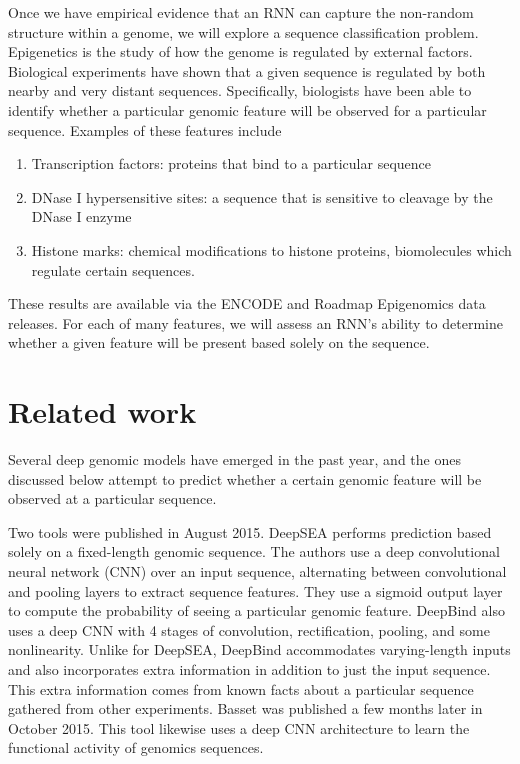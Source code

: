 \documentclass{article} %
\begin{document}
Once we have empirical evidence that an RNN can capture the non-random structure within a genome, we will explore a sequence classification problem. Epigenetics is the study of how the genome is regulated by external factors. Biological experiments have shown that a given sequence is regulated by both nearby and very distant sequences. Specifically, biologists have been able to identify whether a particular genomic feature will be observed for a particular sequence. Examples of these features include
\begin{enumerate}
	\item Transcription factors: proteins that bind to a particular sequence
	\item DNase I hypersensitive sites: a sequence that is sensitive to cleavage by the DNase I enzyme
	\item Histone marks: chemical modifications to histone proteins, biomolecules  which regulate certain sequences.
\end{enumerate}

These results are available via the ENCODE and Roadmap Epigenomics data releases. For each of many features, we will assess an RNN's ability to determine whether a given feature will be present based solely on the sequence.

\section{Related work}

Several deep genomic models have emerged in the past year, and the ones discussed below attempt to predict whether a certain genomic feature will be observed at a particular sequence.

Two tools were published in August 2015. DeepSEA \cite{zhou2015predicting} performs prediction based solely on a fixed-length genomic sequence. The authors use a deep convolutional neural network (CNN) over an input sequence, alternating between convolutional and pooling layers to extract sequence features. They use a sigmoid output layer to compute the probability of seeing a particular genomic feature. DeepBind \cite{alipanahi2015predicting} also uses a deep CNN with 4 stages of convolution, rectification, pooling, and some nonlinearity. Unlike for DeepSEA, DeepBind accommodates varying-length inputs and also incorporates extra information in addition to just the input sequence. This extra information comes from known facts about a particular sequence gathered from other experiments. Basset \cite{kelley2015basset} was published a few months later in October 2015. This tool likewise uses a deep CNN architecture to learn the functional activity of genomics sequences.
\end{document}

